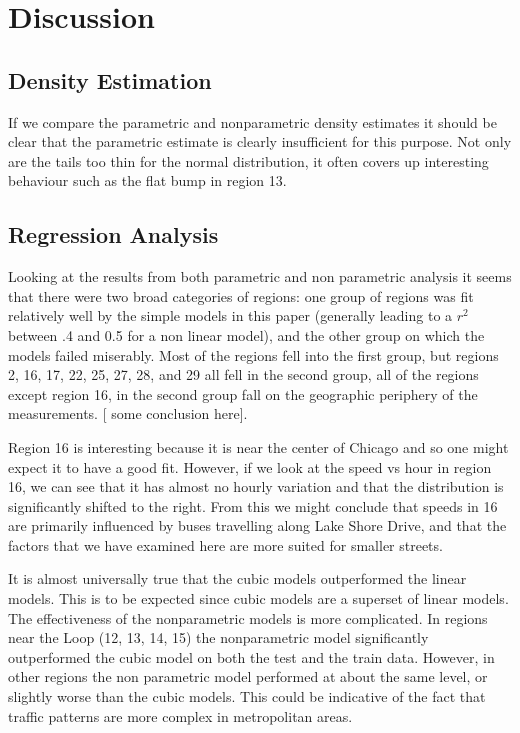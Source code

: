 \documentclass[12pt]{article}
\begin{document}
\section{Discussion}
\subsection{Density Estimation}
If we compare the parametric and nonparametric density estimates it should be clear that the parametric estimate is clearly insufficient for this purpose. Not only are the tails too thin for the normal distribution, it often covers up interesting behaviour such as the flat bump in region 13. 
\subsection{Regression Analysis}
Looking at the results from both parametric and non parametric analysis it seems that there were two broad categories of regions: one group of regions was fit relatively well by the simple models in this paper (generally leading to a $r^2$ between .4 and 0.5 for a non linear model), and the other group on which the models failed miserably. Most of the regions fell into the first group, but regions 2, 16, 17, 22, 25, 27, 28, and 29 all fell in the second group, all of the regions except region 16, in the second group fall on the geographic periphery of the measurements. [ some conclusion here]. 

Region 16 is interesting because it is near the center of Chicago and so one might expect it to have a good fit. However, if we look at the speed vs hour in region 16, we can see that it has almost no hourly variation and that the distribution is significantly shifted to the right. From this we might conclude that speeds in 16 are primarily influenced by buses travelling along Lake Shore Drive, and that the factors that we have examined here are more suited for smaller streets.

It is almost universally true that the cubic models outperformed the linear models. This is to be expected since cubic models are a superset of linear models. The effectiveness of the nonparametric models is more complicated. In regions near the Loop (12, 13, 14, 15) the nonparametric model significantly outperformed the cubic model on both the test and the train data. However, in other regions the non parametric model performed at about the same level, or slightly worse than the cubic models. This could be indicative of the fact that traffic patterns are more complex in metropolitan areas.
\end{document}
